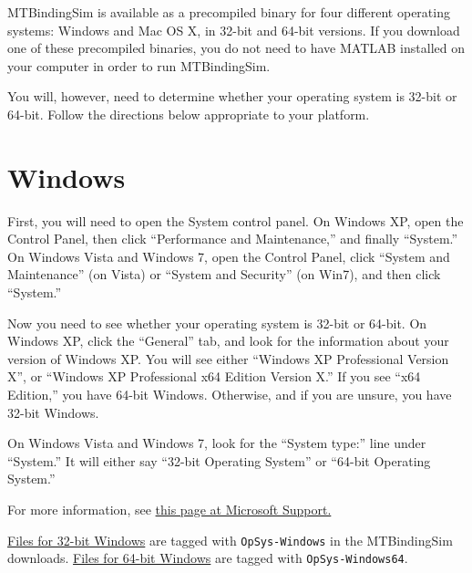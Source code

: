 
MTBindingSim is available as a precompiled binary for four different
operating systems: Windows and Mac OS X, in 32-bit and 64-bit versions.
If you download one of these precompiled binaries, you do not need to
have MATLAB installed on your computer in order to run MTBindingSim.

You will, however, need to determine whether your operating system is
32-bit or 64-bit.  Follow the directions below appropriate to your
platform.



\section{Windows%
  \label{windows}%
}

\noindent{}

First, you will need to open the System control panel.  On Windows XP,
open the Control Panel, then click ``Performance and Maintenance,'' and
finally ``System.''  On Windows Vista and Windows 7, open the Control
Panel, click ``System and Maintenance'' (on Vista) or ``System and Security''
(on Win7), and then click ``System.''

Now you need to see whether your operating system is 32-bit or 64-bit.
On Windows XP, click the ``General'' tab, and look for the information
about your version of Windows XP.  You will see either ``Windows XP
Professional Version X'', or ``Windows XP Professional x64 Edition Version
X.''  If you see ``x64 Edition,'' you have 64-bit Windows.  Otherwise, and
if you are unsure, you have 32-bit Windows.

On Windows Vista and Windows 7, look for the ``System type:'' line under
``System.''  It will either say ``32-bit Operating System'' or ``64-bit
Operating System.''

For more information, see \href{http://support.microsoft.com/kb/827218}{this page at Microsoft Support.}

\href{http://code.google.com/p/mtbindingsim/downloads/list?q=OpSys-Windows}{Files for 32-bit Windows}
are tagged with \texttt{OpSys-Windows} in the MTBindingSim downloads.  \href{http://code.google.com/p/mtbindingsim/downloads/list?q=OpSys-Windows64}{Files
for 64-bit Windows}
are tagged with \texttt{OpSys-Windows64}.



